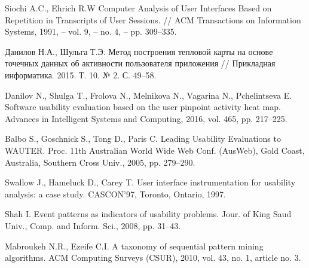 
\begin{thebibliography}{1}
	Siochi A.C., Ehrich R.W
	Computer Analysis of User Interfaces Based on Repetition in Transcripts of User Sessions.
	// ACM Transactions on Information Systems, 1991, -- vol. 9, -- no. 4, -- pp. 309–335.
	
	Данилов Н.А., Шульга Т.Э.
	Метод построения тепловой карты на основе точечных данных об активности пользователя приложения
	// Прикладная информатика. 2015. Т. 10. № 2. С. 49–58.
	
	Danilov N., Shulga T., Frolova N., Melnikova N., Vagarina N., Pchelintseva E.
	Software usability evaluation based on the user pinpoint activity heat map.
	Advances in Intelligent Systems and Computing, 2016, vol. 465, pp. 217–225.
	
	Balbo S., Goschnick S., Tong D., Paris C.
	Leading Usability Evaluations to WAUTER.
	Proc. 11th Australian World Wide Web Conf. (AusWeb), Gold Coast, Australia, Southern Cross Univ., 2005,	pp. 279–290.
	
	Swallow J., Hameluck D., Carey T.
	User interface	instrumentation for usability analysis: a case study.
	CASCON’97, Toronto, Ontario, 1997.
	
	Shah I.
	Event patterns as indicators of usability problems.
	Jour. of King Saud Univ., Comp. and Inform. Sci., 2008, pp. 31–43.
	
	Mabroukeh N.R., Ezeife C.I.
	A taxonomy of sequential pattern mining algorithms.
	ACM Computing Surveys (CSUR), 2010,	vol. 43, no. 1, article no. 3.
	

\end{thebibliography}
